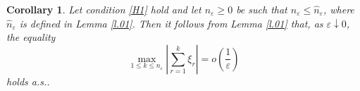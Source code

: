 \documentclass{article}
\theoremstyle{plain}
\newtheorem{corollary}[theorem]{Corollary}
\theoremstyle{definition}
\theoremstyle{remark}
\newcommand{\beq}{\begin{equation}}
\newcommand{\eeq}{\end{equation}}
\begin{document}
\begin{corollary} \label{c.1}Let condition \ref{H1} hold and let $n_\varepsilon \geqslant 0$ be such that $n_\varepsilon \leqslant \hat{n}_\varepsilon$, where $\hat{n}_\varepsilon$ is defined in Lemma \ref{l.01}. 
Then it follows from Lemma \ref{l.01} that, as $\varepsilon\downarrow 0$, the equality
\beq\label{24.10.2}
\max\limits_{1\leqslant k \leqslant n_\varepsilon}\left|\sum\limits_{r=1}^k\xi_r\right|
=o\left(\frac{1}{\varepsilon}\right)
\eeq
holds a.s..
\end{corollary}
\end{document}
